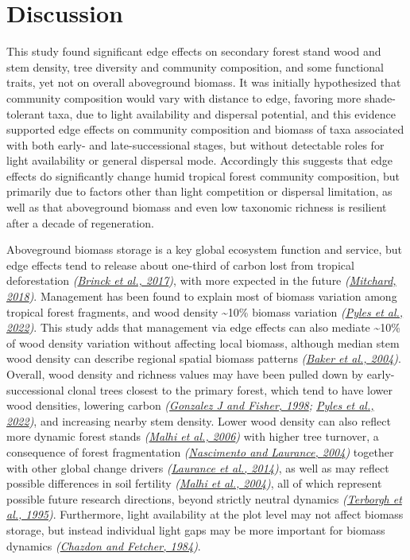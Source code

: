 \documentclass[
  12pt,
]{article}
\begin{document}
\hypertarget{discussion}{%
\section{Discussion}\label{discussion}}

This study found significant edge effects on secondary forest stand wood and stem density, tree diversity and community composition, and some functional traits, yet not on overall aboveground biomass.
It was initially hypothesized that community composition would vary with distance to edge, favoring more shade-tolerant taxa, due to light availability and dispersal potential, and this evidence supported edge effects on community composition and biomass of taxa associated with both early- and late-successional stages, but without detectable roles for light availability or general dispersal mode.
Accordingly this suggests that edge effects do significantly change humid tropical forest community composition, but primarily due to factors other than light competition or dispersal limitation, as well as that aboveground biomass and even low taxonomic richness is resilient after a decade of regeneration.

Aboveground biomass storage is a key global ecosystem function and service, but edge effects tend to release about one-third of carbon lost from tropical deforestation \emph{(\protect\hyperlink{ref-brinck17}{Brinck et al., 2017})}, with more expected in the future \emph{(\protect\hyperlink{ref-mitchard18}{Mitchard, 2018})}.
Management has been found to explain most of biomass variation among tropical forest fragments, and wood density \textasciitilde10\% biomass variation \emph{(\protect\hyperlink{ref-pyles22}{Pyles et al., 2022})}.
This study adds that management via edge effects can also mediate \textasciitilde10\% of wood density variation without affecting local biomass, although median stem wood density can describe regional spatial biomass patterns \emph{(\protect\hyperlink{ref-baker04}{Baker et al., 2004})}.
Overall, wood density and richness values may have been pulled down by early-successional clonal trees closest to the primary forest, which tend to have lower wood densities, lowering carbon \emph{(\protect\hyperlink{ref-gonzalezj98}{Gonzalez J and Fisher, 1998}; \protect\hyperlink{ref-pyles22}{Pyles et al., 2022})}, and increasing nearby stem density.
Lower wood density can also reflect more dynamic forest stands \emph{(\protect\hyperlink{ref-malhi06}{Malhi et al., 2006})} with higher tree turnover, a consequence of forest fragmentation \emph{(\protect\hyperlink{ref-nascimento04a}{Nascimento and Laurance, 2004})} together with other global change drivers \emph{(\protect\hyperlink{ref-laurance14}{Laurance et al., 2014})}, as well as may reflect possible differences in soil fertility \emph{(\protect\hyperlink{ref-malhi04}{Malhi et al., 2004})}, all of which represent possible future research directions, beyond strictly neutral dynamics \emph{(\protect\hyperlink{ref-terborgh95}{Terborgh et al., 1995})}.
Furthermore, light availability at the plot level may not affect biomass storage, but instead individual light gaps may be more important for biomass dynamics \emph{(\protect\hyperlink{ref-chazdon84}{Chazdon and Fetcher, 1984})}.
\end{document}
